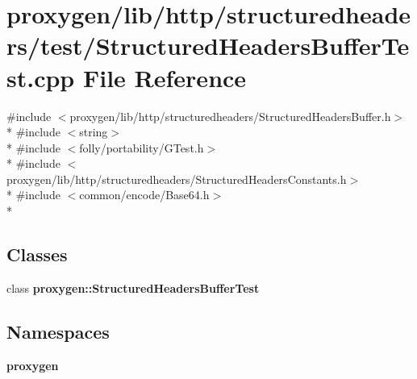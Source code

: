 \section{proxygen/lib/http/structuredheaders/test/\+Structured\+Headers\+Buffer\+Test.cpp File Reference}
\label{StructuredHeadersBufferTest_8cpp}
{\ttfamily \#include $<$proxygen/lib/http/structuredheaders/\+Structured\+Headers\+Buffer.\+h$>$}\\*
{\ttfamily \#include $<$string$>$}\\*
{\ttfamily \#include $<$folly/portability/\+G\+Test.\+h$>$}\\*
{\ttfamily \#include $<$proxygen/lib/http/structuredheaders/\+Structured\+Headers\+Constants.\+h$>$}\\*
{\ttfamily \#include $<$common/encode/\+Base64.\+h$>$}\\*
\subsection*{Classes}
\begin{DoxyCompactItemize}
\item 
class {\bf proxygen\+::\+Structured\+Headers\+Buffer\+Test}
\end{DoxyCompactItemize}
\subsection*{Namespaces}
\begin{DoxyCompactItemize}
\item 
 {\bf proxygen}
\end{DoxyCompactItemize}
